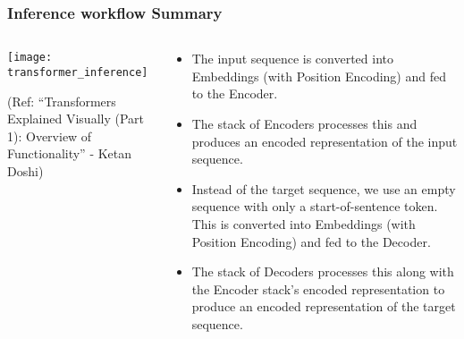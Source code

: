 \begin{frame}[fragile]\frametitle{Inference workflow Summary}

\begin{columns}
     \begin{column}[T]{0.5\linewidth}
\begin{center}
\texttt{[image: transformer\_inference]}


{\tiny (Ref: ``Transformers Explained Visually (Part 1): Overview of Functionality'' - Ketan Doshi)}
\end{center}		

		\end{column}
    \begin{column}[T]{0.5\linewidth}

\begin{itemize}
\item The input sequence is converted into Embeddings (with Position Encoding) and fed to the Encoder.
\item The stack of Encoders processes this and produces an encoded representation of the input sequence.
\item Instead of the target sequence, we use an empty sequence with only a start-of-sentence token. This is converted into Embeddings (with Position Encoding) and fed to the Decoder.
\item The stack of Decoders processes this along with the Encoder stack’s encoded representation to produce an encoded representation of the target sequence.
\end{itemize}
    \end{column}
  \end{columns}	

\end{frame}


